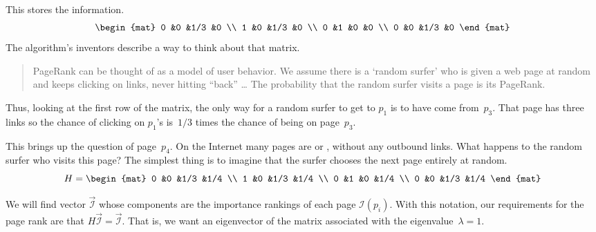 This stores the information.
\begin{equation*}
  \begin{mat}
    0   &0  &1/3  &0   \\
    1   &0  &1/3  &0   \\
    0   &1  &0    &0 \\
    0   &0  &1/3  &0
  \end{mat}
\end{equation*}
The algorithm's inventors describe a way to think about that matrix. 
\begin{quotation}
PageRank can be thought of as a model of user behavior. 
We assume there is a `random surfer' who is
given a web page at random and keeps clicking on links, 
never hitting ``back'' \ldots{} 
The probability that the random surfer visits a page is its PageRank.
\cite{BrinPage}
\end{quotation}
Thus, looking at the first row of the matrix, the only way for a random
surfer to get to $p_1$ is to have come from~$p_3$. 
That page has three links so the chance of clicking on $p_1$'s is~$1/3$
times the chance of being on page~$p_3$.  

This brings up the question of page~$p_4$.
On the Internet many pages are
or ,
without any outbound links.
What happens to the random surfer who visits this page?
The simplest thing is to imagine that the surfer chooses the 
next page entirely at random.
\begin{equation*}
  H=\begin{mat}
    0   &0  &1/3  &1/4   \\
    1   &0  &1/3  &1/4   \\
    0   &1  &0    &1/4 \\
    0   &0  &1/3  &1/4
  \end{mat}
\end{equation*}

We will find vector $\vec{\mathcal{I}}$ whose components are the
importance rankings of each page $\mathcal{I}(p_i)$.
With this notation, 
our requirements for the page rank are that 
$H\vec{\mathcal{I}}=\vec{\mathcal{I}}$.
That is, we want an eigenvector of the matrix associated with the
eigenvalue~$\lambda=1$.

